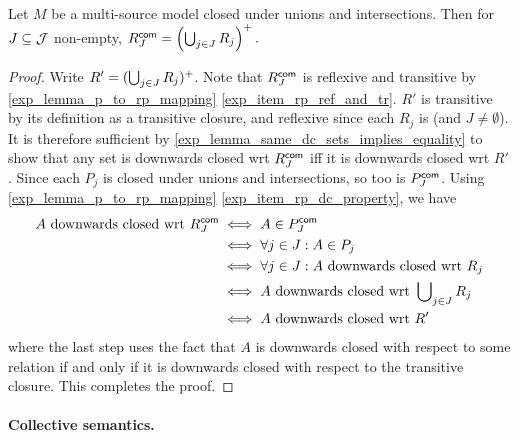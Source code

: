 \begin{proposition}
\label{exp_prop_rcommon}
Let $M$ be a multi-source model closed under unions and intersections.
Then for $J \subseteq \mathcal{J}$ non-empty,
$
R^{\mathsf{com}}_J = \left(
  \bigcup\nolimits_{j \in J}{R_j}
\right)^{+}.$
\end{proposition}
\begin{proof}

    Write $R' = (\bigcup_{j \in J}{R_j})^{+}$. Note that $R^{\mathsf{com}}_J$ is
    reflexive and transitive by \cref{exp_lemma_p_to_rp_mapping}
    \cref{exp_item_rp_ref_and_tr}. $R'$ is transitive by its definition as a
    transitive closure, and reflexive since each $R_j$ is (and $J \ne
    \emptyset$).
    It is therefore sufficient by
\cref{exp_lemma_same_dc_sets_implies_equality} to show that any set
is downwards closed wrt $R^{\mathsf{com}}_J$ iff it is
downwards closed wrt $R'$. Since each $P_j$ is closed under
unions and intersections, so too is $P^{\mathsf{com}}_J$. Using
\cref{exp_lemma_p_to_rp_mapping} \cref{exp_item_rp_dc_property}, we have
\[
\begin{aligned}
   A \text{ downwards closed wrt } R^{\mathsf{com}}_J
   &\iff A \in P^{\mathsf{com}}_J \\
   &\iff \forall j \in J: A \in P_j \\
   &\iff \forall j \in J: A \text{ downwards closed wrt } R_j \\
   &\iff A \text{ downwards closed wrt } \bigcup\nolimits_{j \in J}{R_j} \\
   &\iff A \text{ downwards closed wrt } R'
\end{aligned}\]
where the last step uses the fact that $A$ is downwards closed with respect to
some relation if and only if it is downwards closed with respect to the
transitive closure. This completes the proof.
\end{proof}

\paragraph{Collective semantics.}

